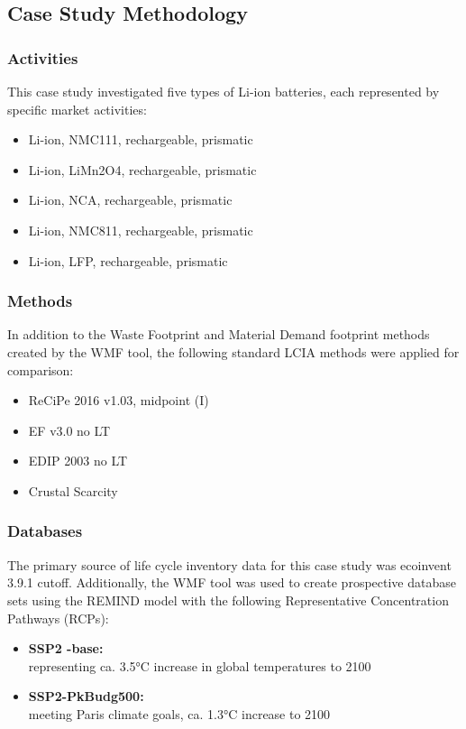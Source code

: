 \subsection{Case Study Methodology}\label{sec:method-case_study}

\subsubsection{Activities}
This case study investigated five types of Li-ion batteries, each represented by specific market activities:
\begin{itemize}[itemsep=0pt]
    \item Li-ion, NMC111, rechargeable, prismatic
    \item Li-ion, LiMn2O4, rechargeable, prismatic
    \item Li-ion, NCA, rechargeable, prismatic
    \item Li-ion, NMC811, rechargeable, prismatic
    \item Li-ion, LFP, rechargeable, prismatic
\end{itemize}

\subsubsection{Methods}
In addition to the Waste Footprint and Material Demand footprint methods created by the WMF tool, the following standard LCIA methods were applied for comparison:
\begin{itemize}[itemsep=0pt]
    \item ReCiPe 2016 v1.03, midpoint (I)
    \item EF v3.0 no LT
    \item EDIP 2003 no LT
    \item Crustal Scarcity
\end{itemize}

\subsubsection{Databases}
The primary source of life cycle inventory data for this case study was ecoinvent 3.9.1 cutoff. Additionally, the WMF tool was used to create prospective database sets using the \mbox{REMIND} model with the following Representative Concentration Pathways (RCPs):
\begin{itemize}
    \item \textbf{SSP2 -base:}\\ representing ca. 3.5°C increase in global temperatures to 2100
    \item \textbf{SSP2-PkBudg500:}\\ meeting Paris climate goals, ca. 1.3°C increase to 2100
\end{itemize}

